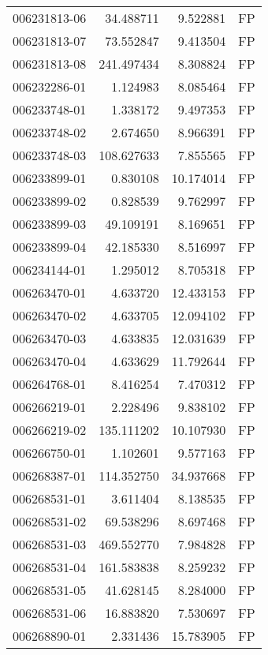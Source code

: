 \begin{tabular}{lrrl}
006231813-06 &   34.488711 &       9.522881 &   FP \\
006231813-07 &   73.552847 &       9.413504 &   FP \\
006231813-08 &  241.497434 &       8.308824 &   FP \\
006232286-01 &    1.124983 &       8.085464 &   FP \\
006233748-01 &    1.338172 &       9.497353 &   FP \\
006233748-02 &    2.674650 &       8.966391 &   FP \\
006233748-03 &  108.627633 &       7.855565 &   FP \\
006233899-01 &    0.830108 &      10.174014 &   FP \\
006233899-02 &    0.828539 &       9.762997 &   FP \\
006233899-03 &   49.109191 &       8.169651 &   FP \\
006233899-04 &   42.185330 &       8.516997 &   FP \\
006234144-01 &    1.295012 &       8.705318 &   FP \\
006263470-01 &    4.633720 &      12.433153 &   FP \\
006263470-02 &    4.633705 &      12.094102 &   FP \\
006263470-03 &    4.633835 &      12.031639 &   FP \\
006263470-04 &    4.633629 &      11.792644 &   FP \\
006264768-01 &    8.416254 &       7.470312 &   FP \\
006266219-01 &    2.228496 &       9.838102 &   FP \\
006266219-02 &  135.111202 &      10.107930 &   FP \\
006266750-01 &    1.102601 &       9.577163 &   FP \\
006268387-01 &  114.352750 &      34.937668 &   FP \\
006268531-01 &    3.611404 &       8.138535 &   FP \\
006268531-02 &   69.538296 &       8.697468 &   FP \\
006268531-03 &  469.552770 &       7.984828 &   FP \\
006268531-04 &  161.583838 &       8.259232 &   FP \\
006268531-05 &   41.628145 &       8.284000 &   FP \\
006268531-06 &   16.883820 &       7.530697 &   FP \\
006268890-01 &    2.331436 &      15.783905 &   FP \\

\end{tabular}

